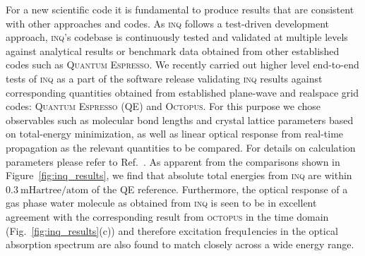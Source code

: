 For a new scientific code it is fundamental to produce results that are consistent with other approaches and codes. 
As \textsc{inq} follows a test-driven development approach, \textsc{inq}'s codebase is continuously tested and validated at multiple levels against analytical results or benchmark data obtained from other established codes such as \textsc{Quantum Espresso}. 
We recently carried out higher level end-to-end tests of \textsc{inq} as a part of the software release validating \textsc{inq} results against corresponding quantities obtained from established plane-wave and realspace grid codes: \textsc{Quantum Espresso} (QE) and \textsc{Octopus}. 
For this purpose we chose observables such as molecular bond lengths and crystal lattice parameters based on total-energy minimization, as well as linear optical response from real-time propagation as the relevant quantities to be compared. 
For details on calculation parameters please refer to Ref.~\cite{Andrade2021}. 
As apparent from the comparisons shown in Figure~\ref{fig:inq_results}, we find that absolute total energies from \textsc{inq} are within \(0.3~\mathrm{mHartree/atom}\) of the QE reference. 
Furthermore, the optical response of a gas phase water molecule as obtained from \textsc{inq} is seen to be in excellent agreement with the corresponding result from \textsc{octopus} in the time domain (Fig.~\ref{fig:inq_results}(c)) and therefore excitation frequ1encies in the optical absorption spectrum are also found to match closely across a wide energy range. 


